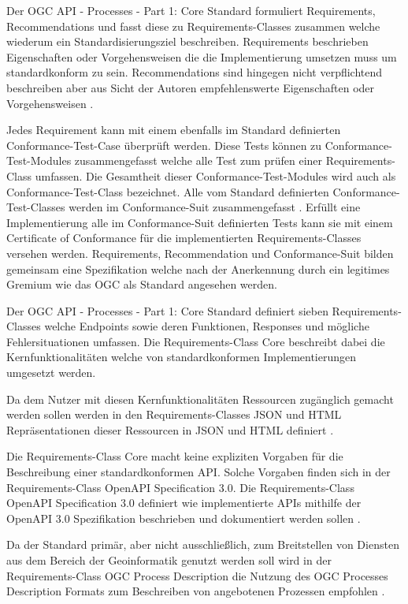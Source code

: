 Der OGC API - Processes - Part 1: Core Standard formuliert Requirements, Recommendations und fasst diese zu Requirements-Classes zusammen welche wiederum 
ein Standardisierungsziel beschreiben. Requirements beschrieben Eigenschaften oder Vorgehensweisen die die Implementierung umsetzen muss um standardkonform zu sein. 
Recommendations sind hingegen nicht verpflichtend beschreiben aber aus Sicht der Autoren empfehlenswerte Eigenschaften oder Vorgehensweisen \cite{ogc_specification_model}. 

Jedes Requirement kann mit einem ebenfalls im Standard definierten Conformance-Test-Case überprüft werden. Diese Tests können zu Conformance-Test-Modules zusammengefasst 
welche alle Test zum prüfen einer Requirements-Class umfassen. Die Gesamtheit dieser Conformance-Test-Modules wird auch als Conformance-Test-Class bezeichnet. Alle vom 
Standard definierten Conformance-Test-Classes werden im Conformance-Suit zusammengefasst \cite{ogc_specification_model}. 
Erfüllt eine Implementierung alle im Conformance-Suit definierten Tests kann sie mit einem Certificate of Conformance für die implementierten Requirements-Classes 
versehen werden. Requirements, Recommendation und Conformance-Suit bilden gemeinsam eine Spezifikation welche nach der Anerkennung durch ein legitimes 
Gremium wie das OGC als Standard angesehen werden.

Der OGC API - Processes - Part 1: Core Standard definiert sieben Requirements-Classes welche Endpoints sowie deren Funktionen, Responses und mögliche Fehlersituationen
umfassen.  
Die Requirements-Class Core beschreibt dabei die Kernfunktionalitäten welche 
von standardkonformen Implementierungen umgesetzt werden. 

Da dem Nutzer mit diesen Kernfunktionalitäten Ressourcen zugänglich gemacht werden sollen werden in den 
Requirements-Classes JSON und HTML Repräsentationen dieser Ressourcen in JSON und HTML definiert \cite{ogc_api_processes_core}. 

Die Requirements-Class Core macht keine expliziten Vorgaben für die Beschreibung einer standardkonformen API. 
Solche Vorgaben finden sich in der Requirements-Class OpenAPI Specification 3.0. 
Die Requirements-Class OpenAPI Specification 3.0 definiert wie implementierte APIs mithilfe der OpenAPI 3.0 Spezifikation beschrieben 
und dokumentiert werden sollen \cite{ogc_api_processes_core}.

Da der Standard primär, aber nicht ausschließlich, zum Breitstellen von Diensten aus dem Bereich der Geoinformatik genutzt werden 
soll wird in der Requirements-Class OGC Process Description die Nutzung des OGC Processes Description Formats zum Beschreiben von 
angebotenen Prozessen empfohlen \cite{ogc_api_processes_core}. 

